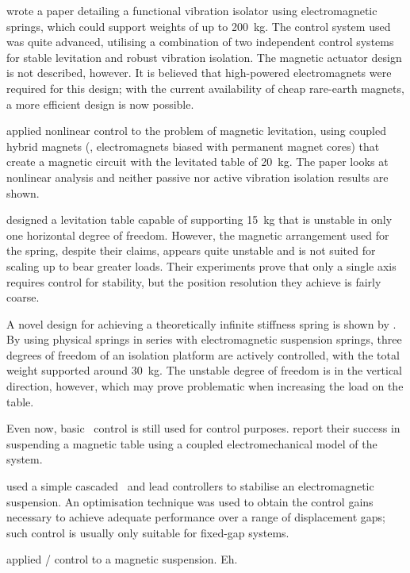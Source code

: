 \textcite{watanabe1996} wrote a paper detailing a functional vibration
isolator using electromagnetic springs, which could support weights of up to
\SI{200}{kg}.
The control system used was quite advanced, utilising a
combination of two independent control systems for stable levitation and
robust vibration isolation.
The magnetic actuator design is not described,
however.
It is believed that high-powered electromagnets were required for
this design; with the current availability of cheap rare-earth magnets, a more
efficient design is now possible.

\textcite{chang2001} applied nonlinear control to the problem of magnetic
levitation, using coupled hybrid magnets (\ie, electromagnets biased with
permanent magnet cores) that create a magnetic circuit with the levitated
table of \SI{20}{kg}.
The paper looks at nonlinear analysis and neither
passive nor active vibration isolation results are shown.

\textcite{choi2003} designed a levitation table capable of supporting
\SI{15}{kg} that is unstable in only one horizontal degree of freedom.
However, the magnetic arrangement used for the spring, despite their claims,
appears quite unstable and is not suited for scaling up to bear greater loads.
Their experiments prove that only a single axis requires control for
stability, but the position resolution they achieve is fairly coarse.

A novel design for achieving a theoretically infinite stiffness spring is
shown by \textcite{mizuno2003a,mizuno2003b}.
By using physical springs in
series with electromagnetic suspension springs, three degrees of freedom of an
isolation platform are actively controlled, with the total weight supported
around \SI{30}{kg}.
The unstable degree of freedom is in the vertical
direction, however, which may prove problematic when increasing the load on
the table.

Even now, basic \PID\ control is still used for control purposes.
\textcite{li2007} report their success in suspending a magnetic table using a
coupled electromechanical model of the system.

\textcite{banerjee2008} used a simple cascaded \PI\ and lead controllers to
stabilise an electromagnetic suspension.
An optimisation technique was used to
obtain the control gains necessary to achieve adequate performance over a
range of displacement gaps; such control is usually only suitable for
fixed-gap systems.

\textcite{gosiewski2008} applied \Hinf/ control to a magnetic suspension.
Eh.


